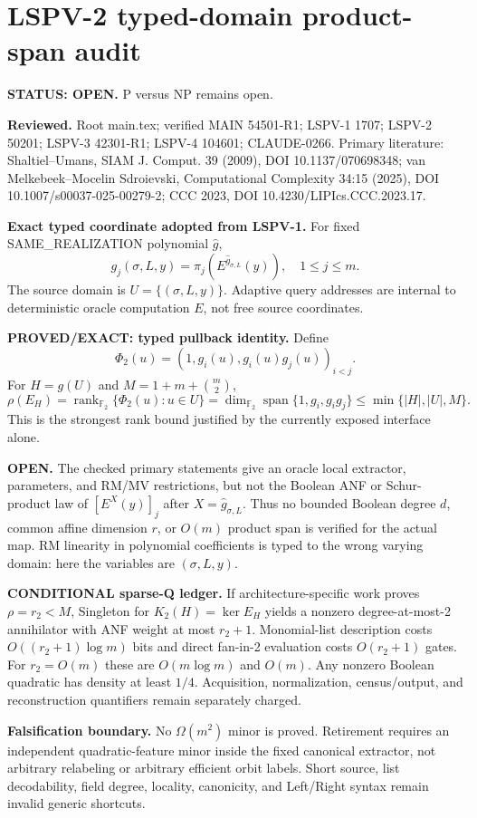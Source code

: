 \documentclass{article}
\begin{document}
\section*{LSPV-2 typed-domain product-span audit}
\textbf{STATUS: OPEN.} P versus NP remains open.

\textbf{Reviewed.} Root main.tex; verified MAIN 54501-R1; LSPV-1 1707; LSPV-2 50201; LSPV-3 42301-R1; LSPV-4 104601; CLAUDE-0266. Primary literature: Shaltiel--Umans, SIAM J. Comput. 39 (2009), DOI 10.1137/070698348; van Melkebeek--Mocelin Sdroievski, Computational Complexity 34:15 (2025), DOI 10.1007/s00037-025-00279-2; CCC 2023, DOI 10.4230/LIPIcs.CCC.2023.17.

\textbf{Exact typed coordinate adopted from LSPV-1.} For fixed SAME\_REALIZATION polynomial $\widehat g$,
\[
g_j(\sigma,L,y)=\pi_j(E^{\widehat g_{\sigma,L}}(y)),\quad 1\le j\le m.
\]
The source domain is $U=\{(\sigma,L,y)\}$. Adaptive query addresses are internal to deterministic oracle computation $E$, not free source coordinates.

\textbf{PROVED/EXACT: typed pullback identity.} Define
\[
\Phi_2(u)=(1,g_i(u),g_i(u)g_j(u))_{i<j}.
\]
For $H=g(U)$ and $M=1+m+\binom m2$,
\[
\rho(E_H)=\operatorname{rank}_{\mathbb F_2}\{\Phi_2(u):u\in U\}
=\dim_{\mathbb F_2}\operatorname{span}\{1,g_i,g_i g_j\}
\le\min\{|H|,|U|,M\}.
\]
This is the strongest rank bound justified by the currently exposed interface alone.

\textbf{OPEN.} The checked primary statements give an oracle local extractor, parameters, and RM/MV restrictions, but not the Boolean ANF or Schur-product law of $[E^X(y)]_j$ after $X=\widehat g_{\sigma,L}$. Thus no bounded Boolean degree $d$, common affine dimension $r$, or $O(m)$ product span is verified for the actual map. RM linearity in polynomial coefficients is typed to the wrong varying domain: here the variables are $(\sigma,L,y)$.

\textbf{CONDITIONAL sparse-Q ledger.} If architecture-specific work proves $\rho=r_2<M$, Singleton for $K_2(H)=\ker E_H$ yields a nonzero degree-at-most-2 annihilator with ANF weight at most $r_2+1$. Monomial-list description costs $O((r_2+1)\log m)$ bits and direct fan-in-2 evaluation costs $O(r_2+1)$ gates. For $r_2=O(m)$ these are $O(m\log m)$ and $O(m)$. Any nonzero Boolean quadratic has density at least $1/4$. Acquisition, normalization, census/output, and reconstruction quantifiers remain separately charged.

\textbf{Falsification boundary.} No $\Omega(m^2)$ minor is proved. Retirement requires an independent quadratic-feature minor inside the fixed canonical extractor, not arbitrary relabeling or arbitrary efficient orbit labels. Short source, list decodability, field degree, locality, canonicity, and Left/Right syntax remain invalid generic shortcuts.
\end{document}
